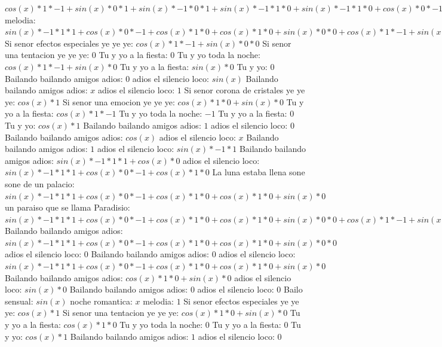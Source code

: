 \documentclass{article}
\begin{document}
${{{{cos(x)*1*-1+sin(x)*0}*1+sin(x)*-1*0}*1+sin(x)*-1*1*0+sin(x)*-1*1*0+cos(x)*0}*-1+{sin(x)*-1*1*1+cos(x)*0}*0+{sin(x)*-1*1*1+cos(x)*0}*0+cos(x)*1*0+{sin(x)*-1*1*1+cos(x)*0}*0+cos(x)*1*0+cos(x)*1*0+sin(x)*0}*1+{{sin(x)*-1*1*1+cos(x)*0}*-1+cos(x)*1*0+cos(x)*1*0+sin(x)*0}*0+{{sin(x)*-1*1*1+cos(x)*0}*-1+cos(x)*1*0+cos(x)*1*0+sin(x)*0}*0+{cos(x)*1*-1+sin(x)*0}*0$  \newline melodia: ${{sin(x)*-1*1*1+cos(x)*0}*-1+cos(x)*1*0+cos(x)*1*0+sin(x)*0}*0+{cos(x)*1*-1+sin(x)*0}*0$  \newline Si senor efectos especiales ye ye ye: ${cos(x)*1*-1+sin(x)*0}*0$ Si senor una tentacion ye ye ye: $0$ Tu y yo a la fiesta: $0$  \newline Tu y yo toda la noche: $cos(x)*1*-1+sin(x)*0$  \newline Tu y yo a la fiesta: $sin(x)*0$ Tu y yo: $0$ Bailando bailando amigos adios: $0$  \newline adios el silencio loco: $sin(x)$  \newline Bailando bailando amigos adios: $x$ adios el silencio loco: $1$  \newline Si senor corona de cristales ye ye ye: $cos(x)*1$ Si senor una emocion ye ye ye: $cos(x)*1*0+sin(x)*0$ Tu y yo a la fiesta: $cos(x)*1*-1$ Tu y yo toda la noche: $-1$ Tu y yo a la fiesta: $0$  \newline Tu y yo: $cos(x)*1$ Bailando bailando amigos adios: $1$ adios el silencio loco: $0$  \newline Bailando bailando amigos adios: $cos(x)$  \newline adios el silencio loco: $x$ Bailando bailando amigos adios: $1$  \newline adios el silencio loco: $sin(x)*-1*1$ Bailando bailando amigos adios: $sin(x)*-1*1*1+cos(x)*0$ adios el silencio loco: ${sin(x)*-1*1*1+cos(x)*0}*-1+cos(x)*1*0$ La luna estaba llena sone sone de un palacio: ${sin(x)*-1*1*1+cos(x)*0}*-1+cos(x)*1*0+cos(x)*1*0+sin(x)*0$ un paraiso que se llama Paradisio: ${{sin(x)*-1*1*1+cos(x)*0}*-1+cos(x)*1*0+cos(x)*1*0+sin(x)*0}*0+{cos(x)*1*-1+sin(x)*0}*0$ Bailando bailando amigos adios: ${{sin(x)*-1*1*1+cos(x)*0}*-1+cos(x)*1*0+cos(x)*1*0+sin(x)*0}*0$ adios el silencio loco: $0$ Bailando bailando amigos adios: $0$  \newline adios el silencio loco: ${sin(x)*-1*1*1+cos(x)*0}*-1+cos(x)*1*0+cos(x)*1*0+sin(x)*0$  \newline Bailando bailando amigos adios: $cos(x)*1*0+sin(x)*0$  \newline adios el silencio loco: $sin(x)*0$ Bailando bailando amigos adios: $0$ adios el silencio loco: $0$  \newline Bailo sensual: $sin(x)$  \newline noche romantica: $x$ melodia: $1$  \newline Si senor efectos especiales ye ye ye: $cos(x)*1$ Si senor una tentacion ye ye ye: $cos(x)*1*0+sin(x)*0$ Tu y yo a la fiesta: $cos(x)*1*0$ Tu y yo toda la noche: $0$ Tu y yo a la fiesta: $0$  \newline Tu y yo: $cos(x)*1$ Bailando bailando amigos adios: $1$ adios el silencio loco: $0$  \newline 
\end{document}
